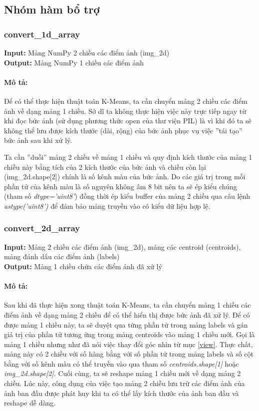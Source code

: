 \documentclass{article}
\begin{document}
\subsection{Nhóm hàm bổ trợ}

\subsubsection{convert\_1d\_array} 
\textbf{Input:} Mảng NumPy 2 chiều các điểm ảnh (img\_2d) \\
\textbf{Output:} Mảng NumPy 1 chiều các điểm ảnh

\paragraph*{Mô tả:}
Để có thể thực hiện thuật toán K-Means, ta cần chuyển mảng 2 chiều các điểm ảnh về dạng mảng 1 chiều. Sở dĩ ta không thực hiện việc này trực tiếp ngay từ khi đọc bức ảnh (sử dụng phương thức open của thư viện PIL) là vì khi đó ta sẽ không thể lưu được kích thước (dài, rộng) của bức ảnh phục vụ việc ''tái tạo'' bức ảnh sau khi xử lý. \par

Ta cần ''duỗi'' mảng 2 chiều về mảng 1 chiều và quy định kích thước của mảng 1 chiều này bằng tích của 2 kích thước của bức ảnh và chiều còn lại (img\_2d.shape[2]) chính là số kênh màu của bức ảnh. Do các giá trị trong mỗi phần tử của kênh màu là số nguyên không âm 8 bit nên ta sẽ ép kiểu chúng (tham số \textit{dtype='uint8'}) đồng thời ép kiểu buffer của mảng 2 chiều qua câu lệnh \textit{astype('uint8')} để đảm bảo mảng truyền vào có kiểu dữ liệu hợp lệ. \par

\subsubsection{convert\_2d\_array}
\textbf{Input:} Mảng 2 chiều các điểm ảnh (img\_2d), mảng các centroid (centroids), mảng đánh dấu các điểm ảnh (labels) \\
\textbf{Output:} Mảng 1 chiều chứa các điểm ảnh đã xử lý

\paragraph{Mô tả:}
Sau khi đã thực hiện xong thuật toán K-Means, ta cần chuyển mảng 1 chiều các điểm ảnh về dạng mảng 2 chiều để có thể hiển thị được bức ảnh đã xử lý. Để có được mảng 1 chiều này, ta sẽ duyệt qua từng phần tử trong mảng labels và gán giá trị của phần tử tương ứng trong mảng centroids vào mảng 1 chiều mới. Gọi là mảng 1 chiều nhưng như đã nói việc thay đổi góc nhìn từ mục \ref{view}. Thực chất, mảng này có 2 chiều với số hàng bằng với số phần tử trong mảng labels và số cột bằng với số kênh màu có thể truyền vào qua tham số \textit{centroids.shape[1]} hoặc \textit{img\_2d.shape[2]}. Cuối cùng, ta sẽ reshape mảng 1 chiều mới về dạng mảng 2 chiều. Lúc này, công dụng của việc tạo mảng 2 chiều lưu trữ các điểm ảnh của ảnh ban đầu được phát huy khi ta có thể lấy kích thước của ảnh ban đầu và reshape dễ dàng.
\end{document}
